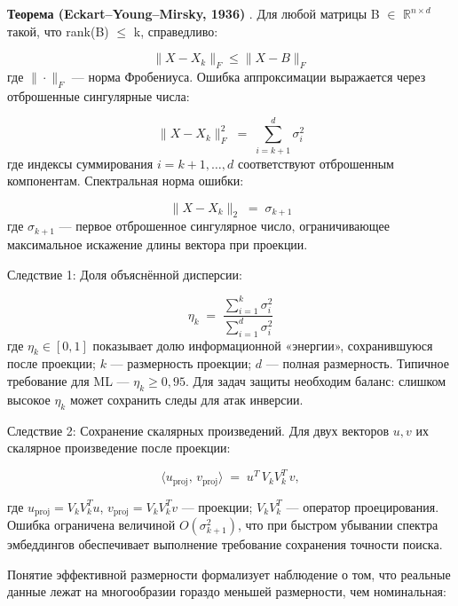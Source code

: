 \documentclass[a4paper, 12pt, oneside, openany]{article}
\begin{document}
\textbf{Теорема (Eckart--Young--Mirsky, 1936)} \cite{ref24}. Для любой матрицы B \(\in\) \(\mathbb{R}^{n \times d}\) такой, что rank(B) \(\leq\) k, справедливо:

\begin{equation}
	\| X - X_{k} \|_{F} \leq \| X - B \|_{F}
	\label{eq:2-4}
\end{equation}
где $\|\cdot\|_{F}$ --- норма Фробениуса. Ошибка аппроксимации выражается через отброшенные сингулярные числа:

\begin{equation}
	\| X - X_{k} \|_{F}^{2} \;=\; \sum_{i = k + 1}^{d} \sigma_{i}^{2}
	\label{eq:2-5}
\end{equation}
где индексы суммирования $i = k + 1, \ldots, d$ соответствуют отброшенным компонентам. Спектральная норма ошибки:

\begin{equation}
	\| X - X_{k} \|_{2} \;=\; \sigma_{k + 1}
	\label{eq:2-6}
\end{equation}
где \(\sigma_{k + 1}\) --- первое отброшенное сингулярное число, ограничивающее максимальное искажение длины вектора при проекции.

Следствие 1: Доля объяснённой дисперсии:

\begin{equation}
	\eta_{k} \;=\; \frac{\sum_{i = 1}^{k} \sigma_{i}^{2}}{\sum_{i = 1}^{d} \sigma_{i}^{2}}
	\label{eq:2-7}
\end{equation}
где $\eta_{k} \in [0, 1]$ показывает долю информационной «энергии», сохранившуюся после проекции; $k$ --- размерность проекции; $d$ --- полная размерность. Типичное требование для ML --- $\eta_{k} \geq 0{,}95$. Для задач защиты необходим баланс: слишком высокое $\eta_{k}$ может сохранить следы для атак инверсии.

Следствие 2: Сохранение скалярных произведений. Для двух векторов $u, v$ их скалярное произведение после проекции:

\[
\langle u_{\mathrm{proj}},\, v_{\mathrm{proj}} \rangle \;=\; u^{T}\, V_{k} V_{k}^{T}\, v,
\]

где $u_{\mathrm{proj}} = V_{k} V_{k}^{T} u$, $v_{\mathrm{proj}} = V_{k} V_{k}^{T} v$ --- проекции; $V_{k} V_{k}^{T}$ --- оператор проецирования. Ошибка ограничена величиной $O(\sigma_{k+1}^{2})$, что при быстром убывании спектра эмбеддингов обеспечивает выполнение требование сохранения точности поиска.

Понятие эффективной размерности формализует наблюдение о том, что реальные данные лежат на многообразии гораздо меньшей размерности, чем номинальная:
\end{document}
